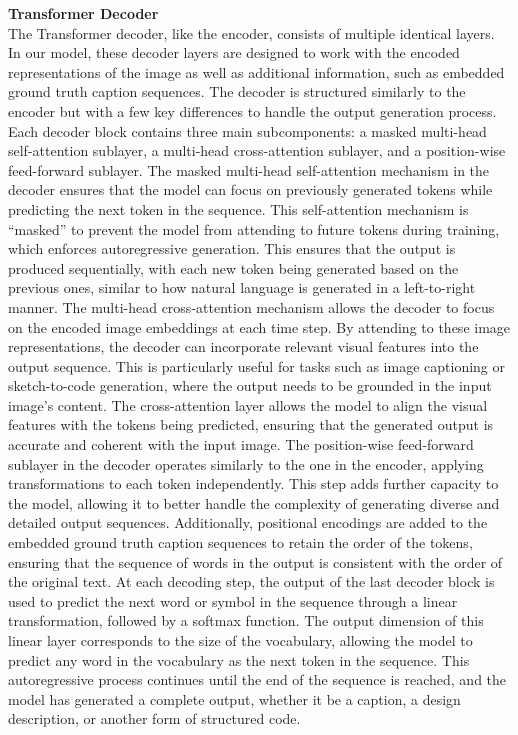 \textbf{Transformer Decoder}\\
The Transformer decoder, like the encoder, consists of multiple identical layers. In our model, these decoder layers are designed to work with the encoded representations of the image as well as additional information, such as embedded ground truth caption sequences. The decoder is structured similarly to the encoder but with a few key differences to handle the output generation process. Each decoder block contains three main subcomponents: a masked multi-head self-attention sublayer, a multi-head cross-attention sublayer, and a position-wise feed-forward sublayer.
The masked multi-head self-attention mechanism in the decoder ensures that the model can focus on previously generated tokens while predicting the next token in the sequence. This self-attention mechanism is “masked” to prevent the model from attending to future tokens during training, which enforces autoregressive generation. This ensures that the output is produced sequentially, with each new token being generated based on the previous ones, similar to how natural language is generated in a left-to-right manner.
The multi-head cross-attention mechanism allows the decoder to focus on the encoded image embeddings at each time step. By attending to these image representations, the decoder can incorporate relevant visual features into the output sequence. This is particularly useful for tasks such as image captioning or sketch-to-code generation, where the output needs to be grounded in the input image’s content. The cross-attention layer allows the model to align the visual features with the tokens being predicted, ensuring that the generated output is accurate and coherent with the input image.
The position-wise feed-forward sublayer in the decoder operates similarly to the one in the encoder, applying transformations to each token independently. This step adds further capacity to the model, allowing it to better handle the complexity of generating diverse and detailed output sequences. Additionally, positional encodings are added to the embedded ground truth caption sequences to retain the order of the tokens, ensuring that the sequence of words in the output is consistent with the order of the original text.
At each decoding step, the output of the last decoder block is used to predict the next word or symbol in the sequence through a linear transformation, followed by a softmax function. The output dimension of this linear layer corresponds to the size of the vocabulary, allowing the model to predict any word in the vocabulary as the next token in the sequence. This autoregressive process continues until the end of the sequence is reached, and the model has generated a complete output, whether it be a caption, a design description, or another form of structured code.

